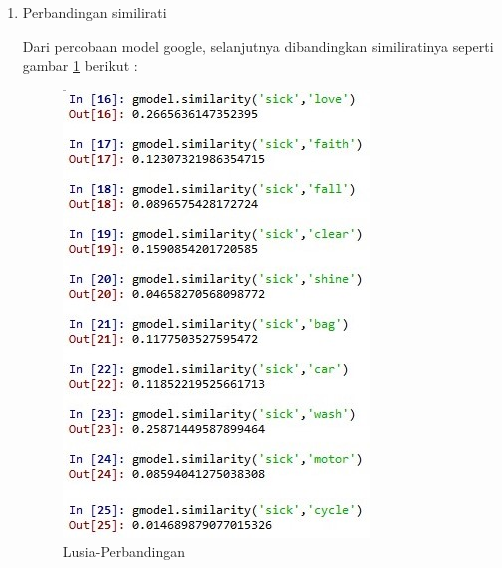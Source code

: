 \begin{enumerate}
\begin{enumerate}
		\item Perbandingan similirati
			\par Dari percobaan model google, selanjutnya dibandingkan similiratinya seperti gambar \ref{5b13} berikut : 
			
			\begin{figure}[ht]
			\centering
			\includegraphics[scale=0.5]{figures/q1.jpg}
			\caption{Lusia-Perbandingan}
			\label{5b13}
			\end{figure}
			

\end{enumerate}
\end{enumerate}
